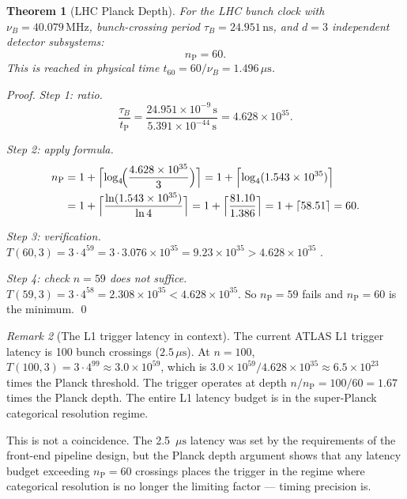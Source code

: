 \documentclass[twocolumn,10pt,a4paper]{article}
\theoremstyle{thmstyle}
\newtheorem{theorem}{Theorem}[section]
\theoremstyle{definition}
\theoremstyle{remark}
\newtheorem{remark}[theorem]{Remark}
\newcommand{\tP}{t_{\mathrm{P}}}
\newcommand{\nP}{n_{\mathrm{P}}}
\begin{document}
\begin{theorem}[LHC Planck Depth]
\label{thm:lhcplanck}
For the LHC bunch clock with $\nu_B = 40.079\,\mathrm{MHz}$,
bunch-crossing period $\tau_B = 24.951\,\mathrm{ns}$, and $d = 3$
independent detector subsystems:
\begin{equation}
\nP = 60.
\label{eq:lhc_nP}
\end{equation}
This is reached in physical time $t_{60} = 60/\nu_B = 1.496\,\mu\mathrm{s}$.
\end{theorem}

\begin{proof}
\emph{Step 1: ratio.}
\[
\frac{\tau_B}{\tP} = \frac{24.951 \times 10^{-9}\,\mathrm{s}}{5.391 \times 10^{-44}\,\mathrm{s}}
= 4.628 \times 10^{35}.
\]

\emph{Step 2: apply formula.}
\begin{align}
\nP &= 1 + \Bigl\lceil \log_4\!\Bigl(\frac{4.628 \times 10^{35}}{3}\Bigr)\Bigr\rceil
= 1 + \Bigl\lceil \log_4(1.543 \times 10^{35})\Bigr\rceil \notag\\
&= 1 + \Bigl\lceil \frac{\ln(1.543 \times 10^{35})}{\ln 4}\Bigr\rceil
= 1 + \Bigl\lceil \frac{81.10}{1.386}\Bigr\rceil
= 1 + \lceil 58.51\rceil = 60.
\end{align}

\emph{Step 3: verification.}
$T(60, 3) = 3 \cdot 4^{59} = 3 \cdot 3.076 \times 10^{35} = 9.23 \times 10^{35}
> 4.628 \times 10^{35}$ \checkmark.

\emph{Step 4: check $n = 59$ does not suffice.}
$T(59, 3) = 3 \cdot 4^{58} = 2.308 \times 10^{35} < 4.628 \times 10^{35}$.
So $\nP = 59$ fails and $\nP = 60$ is the minimum. \qed
\end{proof}

\begin{remark}[The L1 trigger latency in context]
The current ATLAS L1 trigger latency is 100 bunch crossings ($2.5\,\mu\mathrm{s}$).
At $n = 100$, $T(100,3) = 3 \cdot 4^{99} \approx 3.0 \times 10^{59}$, which
is $3.0\times 10^{59} / 4.628\times 10^{35} \approx 6.5 \times 10^{23}$ times
the Planck threshold. The trigger operates at depth $n/\nP = 100/60 = 1.67$
times the Planck depth. The entire L1 latency budget is in the super-Planck
categorical resolution regime.

This is not a coincidence. The 2.5~$\mu\mathrm{s}$ latency was set by the
requirements of the front-end pipeline design, but the Planck depth argument
shows that any latency budget exceeding $\nP = 60$ crossings places the
trigger in the regime where categorical resolution is no longer the limiting
factor — timing precision is.
\end{remark}
\end{document}
